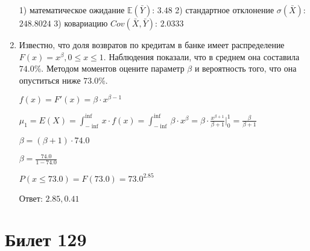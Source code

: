 \documentclass[a4paper,12pt]{article}
\begin{document}
\begin{enumerate}
1) математическое ожидание $\mathbb{E}(\bar Y)$: $3.48$ 
2) стандартное отклонение $\sigma(\bar X)$: $248.8024$
3) ковариацию $Cov(\bar X, \bar Y)$: $2.0333$


\item

    
	Известно, что доля возвратов по кредитам в банке имеет распределение $F(x) = x^{\beta}, 0 \le x \le 1$. Наблюдения показали, что в среднем она составила $74.0$\%. Методом моментов оцените параметр $\beta$ и вероятность того, что она опуститься ниже $73.0$\%.
	


	

	$f(x) = F'(x) = \beta \cdot x^{\beta - 1}$

	$\mu_{1} = E(X) = \int_{-\inf}^{\inf}x \cdot f(x) = \int_{-\inf}^{\inf} \beta \cdot x^{\beta} = \beta \cdot \frac{x^{\beta + 1}}{\beta + 1}\bigg|_0^1 = \frac{\beta}{\beta + 1}$

	$\beta = (\beta + 1) \cdot 74.0$

	$\beta = \frac{74.0}{1 - 74.0}$

	$ P(x \le 73.0) = F(73.0) = 73.0^{2.85} $

    Ответ: $2.85, 0.41$
	


\end{enumerate}

\section{Билет 129}
\end{document}
